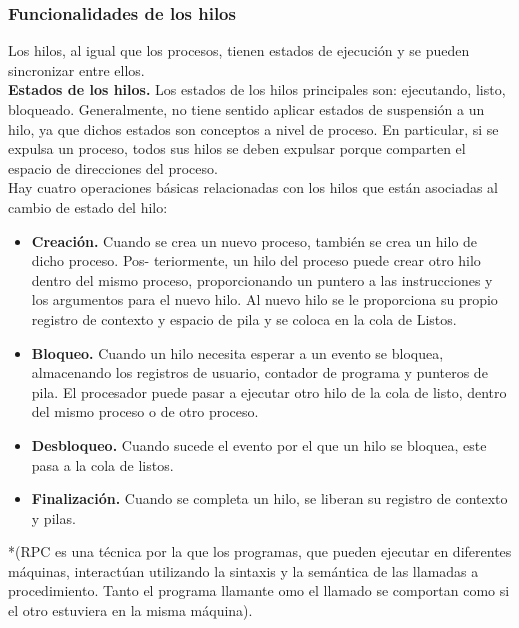 \documentclass{article}
\begin{document}
				\subsubsection{Funcionalidades de los hilos}
					Los hilos, al igual que los procesos, tienen estados de ejecución y se pueden sincronizar entre ellos. \\
					
					\textbf{Estados de los hilos.} Los estados de los hilos principales son: ejecutando, listo, bloqueado. Generalmente, no tiene sentido aplicar estados de suspensión a un hilo, ya que dichos estados son conceptos a nivel de proceso. En particular, si se expulsa un proceso, todos sus hilos se deben expulsar porque comparten el espacio de direcciones del proceso. \\
					
					Hay cuatro operaciones básicas relacionadas con los hilos que están asociadas al cambio de estado del hilo:
					
					\begin{itemize}
					\item \textbf{Creación.} Cuando se crea un nuevo proceso, también se crea un hilo de dicho proceso. Pos-
teriormente, un hilo del proceso puede crear otro hilo dentro del mismo proceso, proporcionando un puntero a las instrucciones y los argumentos para el nuevo hilo. Al nuevo hilo se le proporciona su propio registro de contexto y espacio de pila y se coloca en la cola de Listos. 
					\item \textbf{Bloqueo.} Cuando un hilo necesita esperar a un evento se bloquea, almacenando los registros de usuario, contador de programa y punteros de pila. El procesador puede pasar a ejecutar otro hilo de la cola de listo, dentro del mismo proceso o de otro proceso.
					\item \textbf{Desbloqueo.} Cuando sucede el evento por el que un hilo se bloquea, este pasa a la cola de listos.
					\item \textbf{Finalización.} Cuando se completa un hilo, se liberan su registro de contexto y pilas.
					\end{itemize}
					
					*(RPC es una técnica por la que los programas, que pueden ejecutar en diferentes máquinas, interactúan utilizando la sintaxis y la semántica de las llamadas a procedimiento. Tanto el programa llamante omo el llamado se comportan como si el otro estuviera en la misma máquina). \\
					
\end{document}
